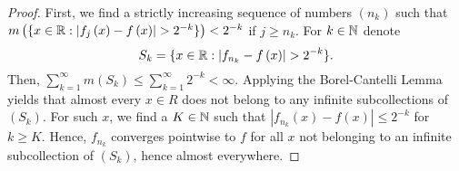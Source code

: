 \begin{proof}
	First, we find a strictly increasing sequence of numbers \(\left( n_{k} \right) \) such that \(m\left( \{x \in \mathbb{R} : \left| f_{j}\left( x \right)  - f\left( x \right)  \right| > 2^{-k}\}  \right) < 2^{-k} \) if \(j \ge n_{k}\). For \(k \in \mathbb{N}\) denote \[
		S_{k} = \{x \in \mathbb{R} : \left| f_{n_{k}} - f\left( x \right)  \right| > 2^{-k}\}
	.\]
	Then, \(\sum_{k=1}^{\infty} m\left( S_{k} \right)  \le \sum_{k=1}^{\infty} 2^{-k} < \infty\). Applying the Borel-Cantelli Lemma yields that almost every \(x\in R\) does not belong to any infinite subcollections of \(\left( S_{k} \right) \). For such \(x\), we find a \(K \in \mathbb{N}\) such that \(\left| f_{n_{k}}\left( x \right)  - f\left( x \right)  \right| \le 2^{-k}\) for \(k \ge K\). Hence, \(f_{n_{k}}\) converges pointwise to \(f\) for all \(x\) not belonging to an infinite subcollection of \(\left( S_{k} \right) \), hence almost everywhere.
\end{proof}
